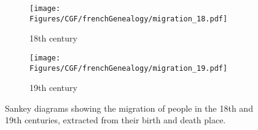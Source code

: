 \begin{figure}
    \centering

    \begin{subfigure}{0.49\linewidth}
        \texttt{[image: Figures/CGF/frenchGenealogy/migration\_18.pdf]}
        \caption{18th century}
    \end{subfigure}
    \begin{subfigure}{0.49\linewidth}
        \texttt{[image: Figures/CGF/frenchGenealogy/migration\_19.pdf]}
        \caption{19th century}
    \end{subfigure}

    \caption{Sankey diagrams showing the migration of people in the 18th and 19th centuries, extracted from their birth and death place.}\label{fig:useCaseNicole2}
\end{figure}






